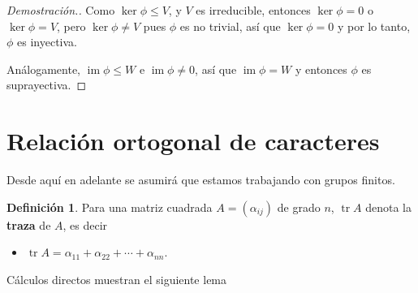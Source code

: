 \documentclass[12pt]{book}
\DeclareMathOperator{\tr}{tr}
\newtheorem{proposition}[theorem]{Proposición}
\theoremstyle{definition}
\newtheorem{definition}[theorem]{Definición}
\newcounter{in}
\newcounter{ini}
\DeclareMathOperator{\im}{im}
\begin{document}
\begin{mdframed}
\begin{proof}[Demostración.]
  Como $\ker \phi\leq V$, y $V$ es irreducible, entonces $\ker \phi=0$
  o~$\ker\phi=V$, pero  $\ker\phi\neq V$ pues $\phi$ es no trivial,
  así que $\ker \phi=0$ y por lo tanto, $\phi$ es inyectiva. 

  Análogamente, $\im\phi\leq W$ e $\im \phi\neq 0$, así que $\im
  \phi=W$ y entonces $\phi$ es suprayectiva.
\end{proof}

%
%
%
\end{mdframed}

\section{Relación ortogonal de caracteres}
\label{sec:roc}
Desde aquí en adelante se asumirá que estamos trabajando con grupos
finitos.

\begin{definition}
Para una matriz cuadrada $A=(\alpha_{ij})$ de grado
$n$, $\tr A$ denota la \textbf{traza} de $A$, es decir
\begin{itemize}
  \item $\tr A= \alpha_{11}+ \alpha_{22} + \cdots + \alpha_{nn}$.
  \end{itemize}
\end{definition}
Cálculos directos muestran el siguiente lema
\end{document}
